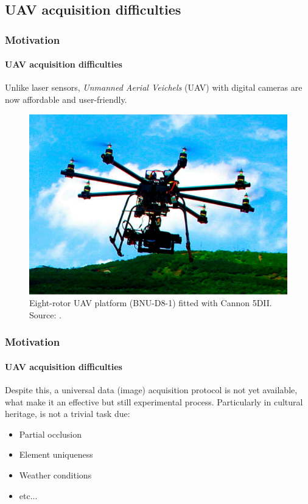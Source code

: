 \documentclass{beamer}
\begin{document}
\subsection{UAV acquisition difficulties}
\begin{frame}
    \frametitle{Motivation}
    \framesubtitle{UAV acquisition difficulties}
    \justifying 
    Unlike laser sensors, \textit{Unmanned Aerial Veichels} (UAV) with digital cameras are now affordable and user-friendly.
    \begin{figure}
        \centering
        \includegraphics[scale=.18]{images/drone}
        \caption{Eight-rotor UAV platform (BNU-D8-1) fitted with Cannon 5DII. Source: \citep{xu2014tridimensional}.}
    \end{figure}
\end{frame}

\begin{frame}
    \frametitle{Motivation}
    \framesubtitle{UAV acquisition difficulties}
    \justifying Despite this, a universal data (image) acquisition protocol is not yet available, what make it an effective but still experimental process. Particularly in cultural heritage, is not a trivial task due:
    
    \begin{itemize}[<+-| alert@+>]
        \item Partial occlusion
        \item Element uniqueness
        \item Weather conditions
        \item etc...
    \end{itemize}
\end{frame}
\end{document}
